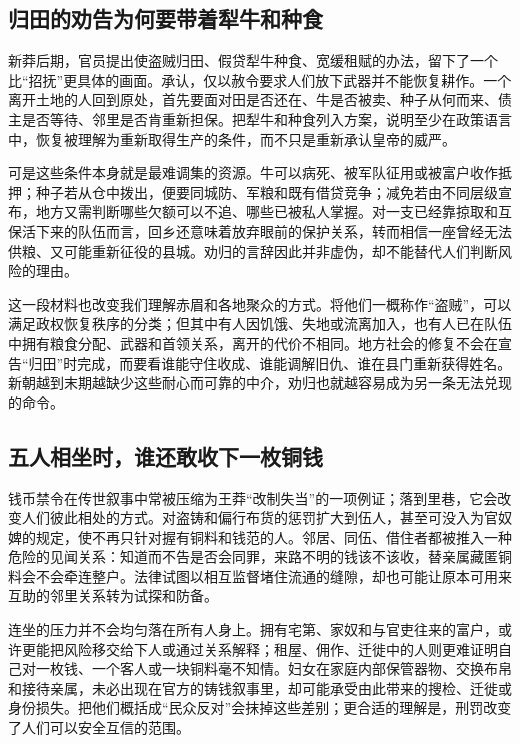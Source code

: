 \subsection{归田的劝告为何要带着犁牛和种食}

新莽后期，官员提出使盗贼归田、假贷犁牛种食、宽缓租赋的办法，留下了一个比“招抚”更具体的画面。承认，仅以赦令要求人们放下武器并不能恢复耕作。一个离开土地的人回到原处，首先要面对田是否还在、牛是否被卖、种子从何而来、债主是否等待、邻里是否肯重新担保。把犁牛和种食列入方案，说明至少在政策语言中，恢复被理解为重新取得生产的条件，而不只是重新承认皇帝的威严。

可是这些条件本身就是最难调集的资源。牛可以病死、被军队征用或被富户收作抵押；种子若从仓中拨出，便要同城防、军粮和既有借贷竞争；减免若由不同层级宣布，地方又需判断哪些欠额可以不追、哪些已被私人掌握。对一支已经靠掠取和互保活下来的队伍而言，回乡还意味着放弃眼前的保护关系，转而相信一座曾经无法供粮、又可能重新征役的县城。劝归的言辞因此并非虚伪，却不能替代人们判断风险的理由。

这一段材料也改变我们理解赤眉和各地聚众的方式。将他们一概称作“盗贼”，可以满足政权恢复秩序的分类；但其中有人因饥饿、失地或流离加入，也有人已在队伍中拥有粮食分配、武器和首领关系，离开的代价不相同。地方社会的修复不会在宣告“归田”时完成，而要看谁能守住收成、谁能调解旧仇、谁在县门重新获得姓名。新朝越到末期越缺少这些耐心而可靠的中介，劝归也就越容易成为另一条无法兑现的命令。

\subsection{五人相坐时，谁还敢收下一枚铜钱}

钱币禁令在传世叙事中常被压缩为王莽“改制失当”的一项例证；落到里巷，它会改变人们彼此相处的方式。对盗铸和偏行布货的惩罚扩大到伍人，甚至可没入为官奴婢的规定，使不再只针对握有铜料和钱范的人。邻居、同伍、借住者都被推入一种危险的见闻关系：知道而不告是否会同罪，来路不明的钱该不该收，替亲属藏匿铜料会不会牵连整户。法律试图以相互监督堵住流通的缝隙，却也可能让原本可用来互助的邻里关系转为试探和防备。

连坐的压力并不会均匀落在所有人身上。拥有宅第、家奴和与官吏往来的富户，或许更能把风险移交给下人或通过关系解释；租屋、佣作、迁徙中的人则更难证明自己对一枚钱、一个客人或一块铜料毫不知情。妇女在家庭内部保管器物、交换布帛和接待亲属，未必出现在官方的铸钱叙事里，却可能承受由此带来的搜检、迁徙或身份损失。把他们概括成“民众反对”会抹掉这些差别；更合适的理解是，刑罚改变了人们可以安全互信的范围。

